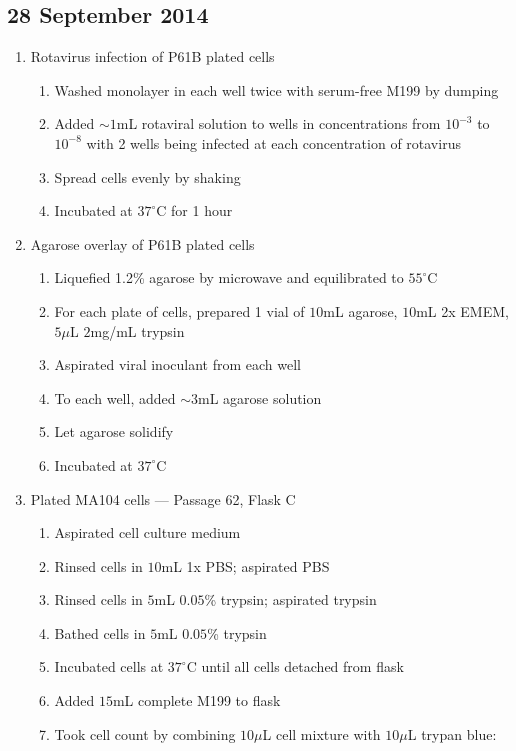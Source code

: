 
\subsection*{28 September 2014}

\begin{enumerate}
	\item Rotavirus infection of P61B plated cells
		\begin{enumerate}
			\item Washed monolayer in each well twice with serum-free M199 by dumping
			\item Added $\sim 1$mL rotaviral solution to wells in concentrations from $10^{-3}$ to $10^{-8}$ with 2 wells being infected at each concentration of rotavirus
			\item Spread cells evenly by shaking
			\item Incubated at $37^{\circ}$C for 1 hour
		\end{enumerate}
	\item Agarose overlay of P61B plated cells
		\begin{enumerate}
			\item Liquefied 1.2\% agarose by microwave and equilibrated to $55^{\circ}$C
			\item For each plate of cells, prepared 1 vial of $10$mL agarose, $10$mL 2x EMEM, $5\mu$L $2$mg/mL trypsin
			\item Aspirated viral inoculant from each well
			\item To each well, added $\sim3$mL agarose solution
			\item Let agarose solidify
			\item Incubated at $37^{\circ}$C
		\end{enumerate}
	\item Plated MA104 cells --- Passage 62, Flask C
		\begin{enumerate}
			\item Aspirated cell culture medium
			\item Rinsed cells in $10$mL 1x PBS; aspirated PBS
			\item Rinsed cells in $5$mL $0.05$\% trypsin; aspirated trypsin
			\item Bathed cells in $5$mL $0.05$\% trypsin
			\item Incubated cells at $37^{\circ}$C until all cells detached from flask
			\item Added $15$mL complete M199 to flask
			\item Took cell count by combining $10\mu$L cell mixture with $10\mu$L trypan blue:
			

\end{enumerate}
\end{enumerate}
